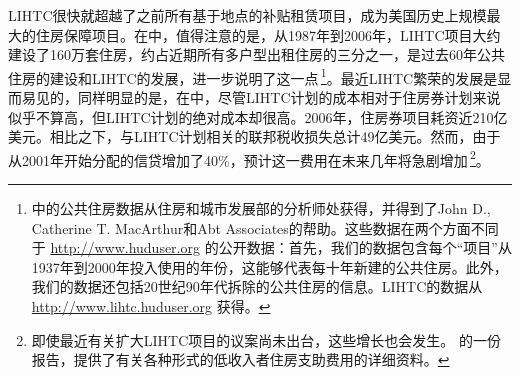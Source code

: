 \documentclass[lang=cn,11pt,a4paper]{paper}
\begin{document}
LIHTC很快就超越了之前所有基于地点的补贴租赁项目，成为美国历史上规模最大的住房保障项目。在中，值得注意的是，从1987年到2006年，LIHTC项目大约建设了160万套住房，约占近期所有多户型出租住房的三分之一，是过去60年公共住房的建设和LIHTC的发展，进一步说明了这一点\,\footnote{中的公共住房数据从住房和城市发展部的分析师处获得，并得到了John D., Catherine T. MacArthur和Abt Associates的帮助。这些数据在两个方面不同于 \url{http://www.huduser.org} 的公开数据：首先，我们的数据包含每个“项目”从1937年到2000年投入使用的年份，这能够代表每十年新建的公共住房。此外，我们的数据还包括20世纪90年代拆除的公共住房的信息。LIHTC的数据从 \url{http://www.lihtc.huduser.org} 获得。}。最近LIHTC繁荣的发展是显而易见的，同样明显的是，在中，尽管LIHTC计划的成本相对于住房券计划来说似乎不算高，但LIHTC计划的绝对成本却很高。2006年，住房券项目耗资近210亿美元。相比之下，与LIHTC计划相关的联邦税收损失总计49亿美元。然而，由于从2001年开始分配的信贷增加了40\%，预计这一费用在未来几年将急剧增加\,\footnote{即使最近有关扩大LIHTC项目的议案尚未出台，这些增长也会发生。\cite{USCongress2005} 的一份报告，提供了有关各种形式的低收入者住房支助费用的详细资料。}。
\end{document}
